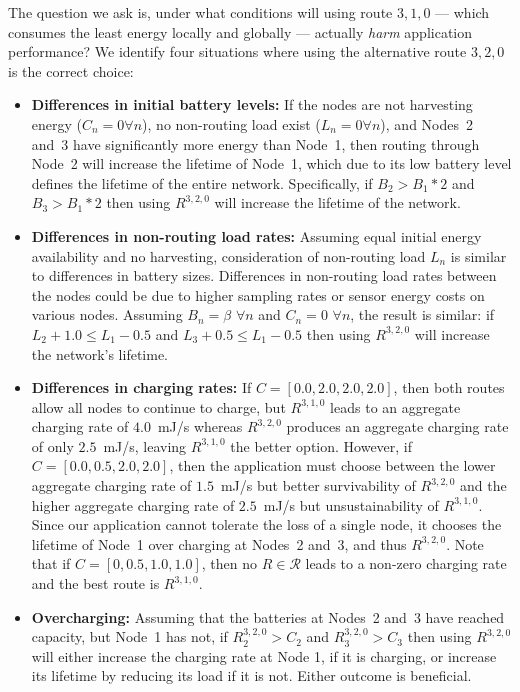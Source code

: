 The question we ask is, under what conditions will using route $3,1,0$ ---
which consumes the least energy locally and globally --- actually
\textit{harm} application performance?  We identify four situations where
using the alternative route $3,2,0$ is the correct choice:

\begin{itemize}

\item \textbf{Differences in initial battery levels:} If the nodes are not
harvesting energy ($C_n = 0 \forall n$), no non-routing load exist ($L_n = 0
\forall n$), and Nodes~2 and~3 have significantly more energy than Node~1,
then routing through Node~2 will increase the lifetime of Node~1, which due
to its low battery level defines the lifetime of the entire network.
Specifically, if $B_2 > B_1 * 2$ and $B_3 > B_1 * 2$  then using $R^{3,2,0}$
will increase the lifetime of the network.

\item \textbf{Differences in non-routing load rates:} Assuming equal initial
energy availability and no harvesting, consideration of non-routing load
$L_n$ is similar to differences in battery sizes. Differences in non-routing
load rates between the nodes could be due to higher sampling rates or sensor
energy costs on various nodes. Assuming $B_n = \beta$ $\forall n$ and $C_n =
0$ $\forall n$, the result is similar: if $L_2 + 1.0 \le L_1 - 0.5$ and $L_3
+ 0.5 \le L_1 - 0.5$ then using $R^{3,2,0}$ will increase the network's
lifetime.

\item \textbf{Differences in charging rates:} If $C = [0.0, 2.0, 2.0, 2.0]$,
then both routes allow all nodes to continue to charge, but $R^{3,1,0}$ leads
to an aggregate charging rate of $4.0$~mJ/s whereas $R^{3,2,0}$ produces an
aggregate charging rate of only $2.5$~mJ/s, leaving $R^{3,1,0}$ the better
option. However, if $C = [0.0, 0.5, 2.0, 2.0]$, then the application must
choose between the lower aggregate charging rate of $1.5$~mJ/s but better
survivability of $R^{3,2,0}$ and the higher aggregate charging rate of
$2.5$~mJ/s but unsustainability of $R^{3,1,0}$. Since our application cannot
tolerate the loss of a single node, it chooses the lifetime of Node~1 over
charging at Nodes~2 and~3, and thus $R^{3,2,0}$. Note that if $C = [0, 0.5,
1.0, 1.0]$, then no $R \in \mathcal{R}$ leads to a non-zero charging rate and
the best route is $R^{3,1,0}$.

\item \textbf{Overcharging:} Assuming that the batteries at Nodes~2 and~3
have reached capacity, but Node~1 has not, if $R^{3,2,0}_2 > C_2$ and
$R^{3,2,0}_3 > C_3$ then using $R^{3,2,0}$ will either increase the charging
rate at Node 1, if it is charging, or increase its lifetime by reducing its
load if it is not. Either outcome is beneficial.

\end{itemize}

